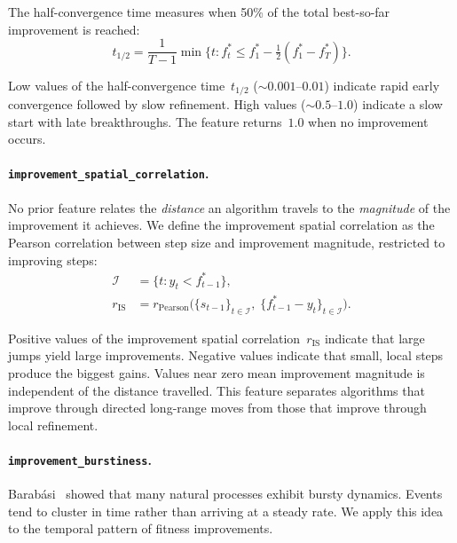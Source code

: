 The half-convergence time measures when 50\% of the total best-so-far
improvement is reached:
\begin{equation}
\label{eq:halftime}
  t_{1/2}
    = \frac{1}{T-1}\min\!\bigl\{t : f^*_t \le f^*_1
      - \tfrac{1}{2}(f^*_1 - f^*_T)\bigr\}.
\end{equation}

Low values of the half-convergence time~$t_{1/2}$
(${\sim}0.001\text{--}0.01$) indicate rapid early convergence
followed by slow refinement. High values (${\sim}0.5\text{--}1.0$) indicate
a slow start with late breakthroughs.  The feature returns~$1.0$ when no
improvement occurs.

\paragraph{\texttt{improvement\_spatial\_correlation}.}
\label{sec:features:novel:impspatial}

No prior feature relates the \emph{distance} an algorithm travels to the
\emph{magnitude} of the improvement it achieves.  We define the improvement
spatial correlation as the Pearson correlation between step size and
improvement magnitude, restricted to improving steps:
\begin{align}
\label{eq:impspatial}
  \mathcal{I} &= \{t : y_t < f^*_{t-1}\}, \nonumber \\
  r_{\mathrm{IS}}
    &= r_{\mathrm{Pearson}}\!\bigl(
         \{s_{t-1}\}_{t \in \mathcal{I}},\;
         \{f^*_{t-1} - y_t\}_{t \in \mathcal{I}}
       \bigr).
\end{align}

Positive values of the improvement spatial
correlation~$r_{\mathrm{IS}}$ indicate that large jumps yield large
improvements.
Negative values indicate that small, local steps produce the biggest gains.  Values near zero mean improvement
magnitude is independent of the distance travelled.  This feature separates
algorithms that improve through directed long-range moves from those that
improve through local refinement.

\paragraph{\texttt{improvement\_burstiness}.}
\label{sec:features:novel:burst}

Barab\'asi~\cite{barabasi2005bursts} showed that many natural processes exhibit bursty dynamics. Events tend to cluster in time rather than arriving at a steady rate.
We apply this idea to the temporal pattern of fitness improvements.

